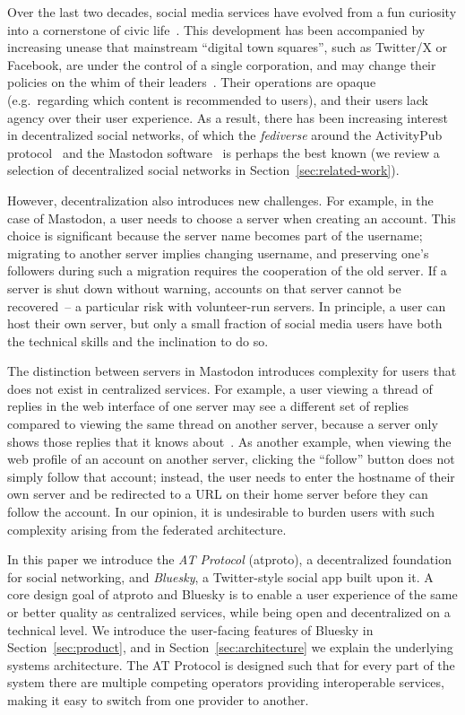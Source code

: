 \documentclass[sigconf,nonacm]{acmart}
\begin{document}
Over the last two decades, social media services have evolved from a fun curiosity into a cornerstone of civic life~\cite{Barabas:2017}.
This development has been accompanied by increasing unease that mainstream ``digital town squares'', such as Twitter/X or Facebook, are under the control of a single corporation, and may change their policies on the whim of their leaders~\cite{Yeung:2023}.
Their operations are opaque (e.g.\ regarding which content is recommended to users), and their users lack agency over their user experience.
As a result, there has been increasing interest in decentralized social networks, of which the \emph{fediverse} around the ActivityPub protocol~\cite{ActivityPub} and the Mastodon software~\cite{Mastodon} is perhaps the best known (we review a selection of decentralized social networks in Section~\ref{sec:related-work}).

However, decentralization also introduces new challenges.
For example, in the case of Mastodon, a user needs to choose a server when creating an account.
This choice is significant because the server name becomes part of the username; migrating to another server implies changing username, and preserving one's followers during such a migration requires the cooperation of the old server.
If a server is shut down without warning, accounts on that server cannot be recovered~-- a particular risk with volunteer-run servers.
In principle, a user can host their own server, but only a small fraction of social media users have both the technical skills and the inclination to do so.

The distinction between servers in Mastodon introduces complexity for users that does not exist in centralized services.
For example, a user viewing a thread of replies in the web interface of one server may see a different set of replies compared to viewing the same thread on another server, because a server only shows those replies that it knows about~\cite{Adida:2022}.
As another example, when viewing the web profile of an account on another server, clicking the ``follow'' button does not simply follow that account; instead, the user needs to enter the hostname of their own server and be redirected to a URL on their home server before they can follow the account.
In our opinion, it is undesirable to burden users with such complexity arising from the federated architecture.

In this paper we introduce the \emph{AT Protocol} (atproto), a decentralized foundation for social networking, and \emph{Bluesky}, a Twitter-style social app built upon it.
A core design goal of atproto and Bluesky is to enable a user experience of the same or better quality as centralized services, while being open and decentralized on a technical level.
We introduce the user-facing features of Bluesky in Section~\ref{sec:product}, and in Section~\ref{sec:architecture} we explain the underlying systems architecture.
The AT Protocol is designed such that for every part of the system there are multiple competing operators providing interoperable services, making it easy to switch from one provider to another.
\end{document}
